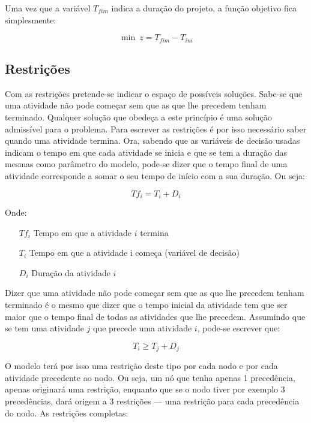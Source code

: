 Uma vez que a variável $T_{fim}$ indica a duração do projeto, a função
objetivo fica simplesmente:

\begin{displaymath} 
	\min~z = T_{fim}-T_{ini} 
\end{displaymath}

\subsection{Restrições}

Com as restrições pretende-se indicar o espaço de possíveis soluções. Sabe-se
que uma atividade não pode começar sem que as que lhe precedem tenham terminado.
Qualquer solução que obedeça a este princípio é uma solução admissível para
o problema. Para escrever as restrições é por isso necessário saber quando uma
atividade termina. Ora, sabendo que as variáveis de decisão usadas indicam
o tempo em que cada atividade se inicia e que se tem a duração das mesmas como
parâmetro do modelo, pode-se dizer que o tempo final de uma atividade
corresponde a somar o seu tempo de início com a sua duração. Ou seja:

\begin{displaymath} Tf_{i} = T_{i} + D_{i} \end{displaymath}

Onde:

\begin{itemize} \item[$Tf_{i}$] Tempo em que a atividade $i$ termina
		\item[$T_{i}$] Tempo em que a atividade i começa (variável de decisão)
		\item[$D_{i}$] Duração da atividade $i$ \end{itemize}

Dizer que uma atividade não pode começar sem que as que lhe precedem tenham
terminado é o mesmo que dizer que o tempo inicial da atividade tem que ser maior
que o tempo final de todas as atividades que lhe precedem. Assumindo que se tem
uma atividade $j$ que precede uma atividade $i$, pode-se escrever que:

\begin{displaymath} T_{i} \geq T_{j} + D_{j} \end{displaymath}

O modelo terá por isso uma restrição deste tipo por cada nodo e por cada
atividade precedente ao nodo. Ou seja, um nó que tenha apenas 1 precedência,
apenas originará uma restrição, enquanto que se o nodo tiver por exemplo
3 precedências, dará origem a 3 restrições --- uma restrição para cada precedência
do nodo. 
As restrições completas:

